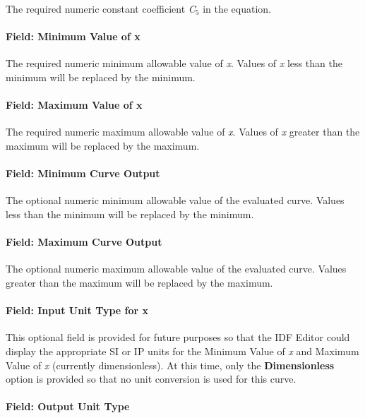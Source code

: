 The required numeric constant coefficient \emph{C\(_{5}\)} in the equation.

\paragraph{Field: Minimum Value of x}\label{field-minimum-value-of-x-13}

The required numeric minimum allowable value of \emph{x}. Values of \emph{x} less than the minimum will be replaced by the minimum.

\paragraph{Field: Maximum Value of x}\label{field-maximum-value-of-x-14}

The required numeric maximum allowable value of \emph{x}. Values of \emph{x} greater than the maximum will be replaced by the maximum.

\paragraph{Field: Minimum Curve Output}\label{field-minimum-curve-output-13}

The optional numeric minimum allowable value of the evaluated curve. Values less than the minimum will be replaced by the minimum.

\paragraph{Field: Maximum Curve Output}\label{field-maximum-curve-output-12}

The optional numeric maximum allowable value of the evaluated curve. Values greater than the maximum will be replaced by the maximum.

\paragraph{Field: Input Unit Type for x}\label{field-input-unit-type-for-x-13}

This optional field is provided for future purposes so that the IDF Editor could display the appropriate SI or IP units for the Minimum Value of \emph{x} and Maximum Value of \emph{x} (currently dimensionless). At this time, only the \textbf{Dimensionless} option is provided so that no unit conversion is used for this curve.

\paragraph{Field: Output Unit Type}\label{field-output-unit-type-12}

